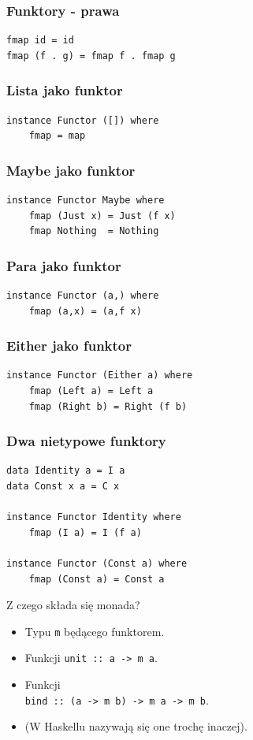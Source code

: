 \documentclass[14pt]{beamer}
\begin{document}
\begin{frame}[fragile]
\frametitle{Funktory - prawa}
\begin{verbatim}
fmap id = id
fmap (f . g) = fmap f . fmap g
\end{verbatim}
\end{frame}

\begin{frame}[fragile]
\frametitle{Lista jako funktor}
\begin{verbatim}
instance Functor ([]) where
    fmap = map
\end{verbatim}
\end{frame}

\begin{frame}[fragile]
\frametitle{Maybe jako funktor}
\begin{verbatim}
instance Functor Maybe where
    fmap (Just x) = Just (f x)
    fmap Nothing  = Nothing
\end{verbatim}
\end{frame}

\begin{frame}[fragile]
\frametitle{Para jako funktor}
\begin{verbatim}
instance Functor (a,) where
    fmap (a,x) = (a,f x)
\end{verbatim}
\end{frame}

\begin{frame}[fragile]
\frametitle{Either jako funktor}
\begin{verbatim}
instance Functor (Either a) where
    fmap (Left a) = Left a
    fmap (Right b) = Right (f b)
\end{verbatim}
\end{frame}

\begin{frame}[fragile]
\frametitle{Dwa nietypowe funktory}
\begin{verbatim}
data Identity a = I a
data Const x a = C x

instance Functor Identity where
    fmap (I a) = I (f a)

instance Functor (Const a) where
    fmap (Const a) = Const a
\end{verbatim}
\end{frame}

\begin{frame}{Z czego składa się monada?}
    \begin{itemize}
        \item Typu \texttt{m} będącego funktorem.
        \item Funkcji \texttt{unit :: a -> m a}.
        \item Funkcji\\
            \texttt{bind :: (a -> m b) -> m a -> m b}.
        \pause
        \item (W Haskellu nazywają się one trochę inaczej).
    \end{itemize}
\end{frame}
\end{document}

